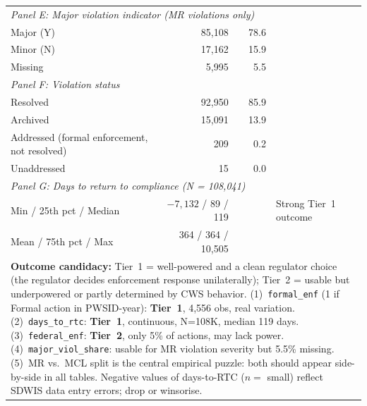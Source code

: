 \begin{table}[h!]
\begin{tabular}{p{5.5cm}rrl}
\multicolumn{4}{l}{\textit{Panel E: Major violation indicator (MR violations only)}} \\
Major (Y) & 85,108 & 78.6 & \\
Minor (N) & 17,162 & 15.9 & \\
Missing & 5,995 & 5.5 & \\[6pt]

\multicolumn{4}{l}{\textit{Panel F: Violation status}} \\
Resolved & 92,950 & 85.9 & \\
Archived & 15,091 & 13.9 & \\
Addressed (formal enforcement, not resolved) & 209 & 0.2 & \\
Unaddressed & 15 & 0.0 & \\[6pt]

\multicolumn{4}{l}{\textit{Panel G: Days to return to compliance (N = 108,041)}} \\
Min / 25th pct / Median & $-7,132$ / 89 / 119 & & Strong Tier~1 outcome \\
Mean / 75th pct / Max & 364 / 364 / 10,505 & & \\
\hline\hline
\multicolumn{4}{p{13cm}}{\footnotesize \textbf{Outcome candidacy:} Tier~1 = well-powered and a clean regulator choice (the regulator decides enforcement response unilaterally); Tier~2 = usable but underpowered or partly determined by CWS behavior. (1)~\texttt{formal\_enf} (1 if Formal action in PWSID-year): \textbf{Tier~1}, 4,556 obs, real variation. (2)~\texttt{days\_to\_rtc}: \textbf{Tier~1}, continuous, N=108K, median 119 days. (3)~\texttt{federal\_enf}: \textbf{Tier~2}, only 5\% of actions, may lack power. (4)~\texttt{major\_viol\_share}: usable for MR violation severity but 5.5\% missing. (5)~MR vs.\ MCL split is the central empirical puzzle: both should appear side-by-side in all tables. Negative values of days-to-RTC ($n=$ small) reflect SDWIS data entry errors; drop or winsorise.} \\
\end{tabular}
\end{table}

